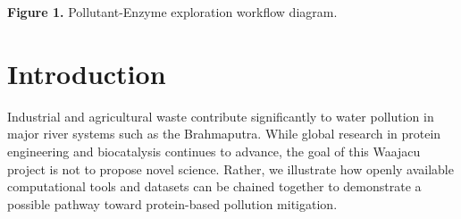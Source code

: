 \documentclass[conference]{IEEEtran}
\begin{document}
{\begin{minipage}{\textwidth}
{


  }
  \par\smallskip
  \small\textbf{Figure 1.} Pollutant-Enzyme exploration workflow diagram.
  \end{minipage}\par\medskip
}

\maketitle

\begin{abstract}
    This work presents a demonstration of how open-source tools and freely available databases can be integrated to explore possible 
    bioremediation strategies. No new algorithms or methods are introduced. Instead, we show how existing resources can be combined 
    into a workflow that identifies candidate protein structures with potential to interact with common pollutants. The demonstration 
    focuses on pollutants reported in the Brahmaputra.
\end{abstract}

\section{Introduction}
Industrial and agricultural waste contribute significantly to water pollution in major river systems such as the Brahmaputra. 
While global research in protein engineering and biocatalysis continues to advance, the goal of this Waajacu project is not to propose 
novel science. Rather, we illustrate how openly available computational tools and datasets can be chained together 
to demonstrate a possible pathway toward protein-based pollution mitigation.
\end{document}
